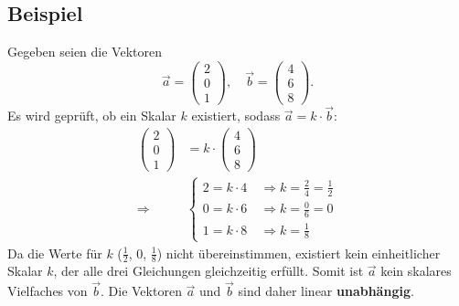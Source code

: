 \subsection*{Beispiel}
Gegeben seien die Vektoren
\[
    \vec{a} = \begin{pmatrix} 2 \\ 0 \\ 1 \end{pmatrix}, \quad \vec{b} = \begin{pmatrix} 4 \\ 6 \\ 8 \end{pmatrix}.
\]
Es wird geprüft, ob ein Skalar $k$ existiert, sodass $\vec{a} = k \cdot \vec{b}$:
\begin{align*}
    \begin{pmatrix} 2 \\ 0 \\ 1 \end{pmatrix} &= k \cdot \begin{pmatrix} 4 \\ 6 \\ 8 \end{pmatrix} \\
    \Rightarrow \quad & \begin{cases} 
        2 = k \cdot 4 \quad \Rightarrow k = \frac{2}{4} = \frac{1}{2} \\
        0 = k \cdot 6 \quad \Rightarrow k = \frac{0}{6} = 0 \\
        1 = k \cdot 8 \quad \Rightarrow k = \frac{1}{8}
    \end{cases}
\end{align*}
Da die Werte für $k$ ($\frac{1}{2}$, $0$, $\frac{1}{8}$) nicht übereinstimmen, existiert kein einheitlicher Skalar $k$, der alle drei Gleichungen gleichzeitig erfüllt. Somit ist $\vec{a}$ kein skalares Vielfaches von $\vec{b}$. Die Vektoren $\vec{a}$ und $\vec{b}$ sind daher linear \textbf{unabhängig}.

